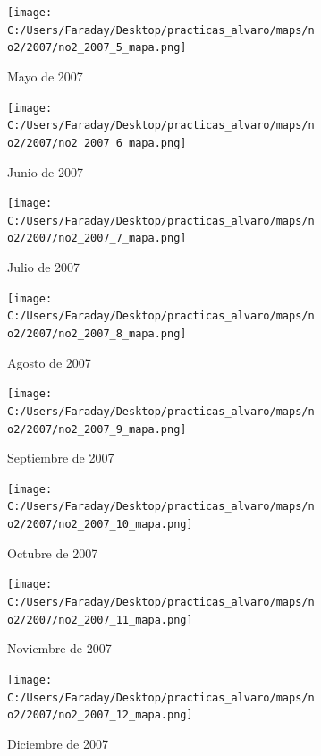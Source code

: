 \documentclass[12pt]{article}
\begin{document}
\newpage

\begin{figure}[H]
\centering
\begin{subfigure}[h]{0.45\textwidth}
\texttt{[image: C:/Users/Faraday/Desktop/practicas\_alvaro/maps/no2/2007/no2\_2007\_5\_mapa.png]}
\caption{Mayo de 2007}
\label{fig:map-mon-1-5-2007}
\end{subfigure}
%
\begin{subfigure}[H]{0.45\textwidth}
\texttt{[image: C:/Users/Faraday/Desktop/practicas\_alvaro/maps/no2/2007/no2\_2007\_6\_mapa.png]}
\caption{Junio de 2007}
\label{fig:map-mon-1-6-2007}
\end{subfigure}
\caption{}
\end{figure}

\begin{figure}[H]
\centering
\begin{subfigure}[h]{0.45\textwidth}
\texttt{[image: C:/Users/Faraday/Desktop/practicas\_alvaro/maps/no2/2007/no2\_2007\_7\_mapa.png]}
\caption{Julio de 2007}
\label{fig:map-mon-1-7-2007}
\end{subfigure}
%
\begin{subfigure}[H]{0.45\textwidth}
\texttt{[image: C:/Users/Faraday/Desktop/practicas\_alvaro/maps/no2/2007/no2\_2007\_8\_mapa.png]}
\caption{Agosto de 2007}
\label{fig:map-mon-1-8-2007}
\end{subfigure}
\caption{}
\end{figure}

\begin{figure}[H]
\centering
\begin{subfigure}[h]{0.45\textwidth}
\texttt{[image: C:/Users/Faraday/Desktop/practicas\_alvaro/maps/no2/2007/no2\_2007\_9\_mapa.png]}
\caption{Septiembre de 2007}
\label{fig:map-mon-1-9-2007}
\end{subfigure}
%
\begin{subfigure}[H]{0.45\textwidth}
\texttt{[image: C:/Users/Faraday/Desktop/practicas\_alvaro/maps/no2/2007/no2\_2007\_10\_mapa.png]}
\caption{Octubre de 2007}
\label{fig:map-mon-1-10-2007}
\end{subfigure}
\caption{}
\end{figure}

\newpage

\begin{figure}[H]
\centering
\begin{subfigure}[h]{0.45\textwidth}
\texttt{[image: C:/Users/Faraday/Desktop/practicas\_alvaro/maps/no2/2007/no2\_2007\_11\_mapa.png]}
\caption{Noviembre de 2007}
\label{fig:map-mon-1-11-2007}
\end{subfigure}
%
\begin{subfigure}[H]{0.45\textwidth}
\texttt{[image: C:/Users/Faraday/Desktop/practicas\_alvaro/maps/no2/2007/no2\_2007\_12\_mapa.png]}
\caption{Diciembre de 2007}
\label{fig:map-mon-1-12-2007}
\end{subfigure}
\caption{}
\end{figure}
\end{document}
